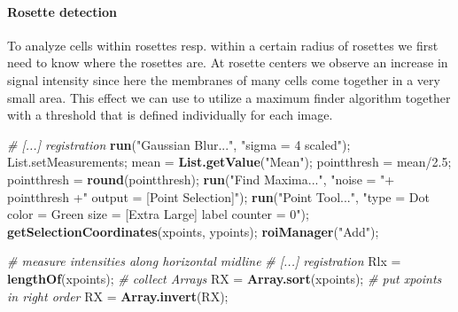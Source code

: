 \documentclass[11pt,singlespacinge,twoside]{reedthesis} %
\newenvironment{Shaded}{}{}
\newcommand{\CommentTok}[1]{\textit{#1}}
\newcommand{\FloatTok}[1]{#1}
\newcommand{\KeywordTok}[1]{\textbf{#1}}
\newcommand{\NormalTok}[1]{#1}
\newcommand{\OperatorTok}[1]{#1}
\newcommand{\StringTok}[1]{#1}
\theoremstyle{definition}
\theoremstyle{definition}
\theoremstyle{definition}
\theoremstyle{remark}
\begin{document}
\hypertarget{rosette-detection}{%
\paragraph{Rosette detection}\label{rosette-detection}}

To analyze cells within rosettes resp. within a certain radius of rosettes we first need to know where the rosettes are. At rosette centers we observe an increase in signal intensity since here the membranes of many cells come together in a very small area. This effect we can use to utilize a maximum finder algorithm together with a threshold that is defined individually for each image.

\scriptsize
\begin{Shaded}
\begin{Highlighting}[numbers=left,,]
\CommentTok{#  [...] registration}
    \KeywordTok{run}\NormalTok{(}\StringTok{"Gaussian Blur..."}\NormalTok{, }\StringTok{"sigma = 4 scaled"}\NormalTok{);}
\NormalTok{    List.setMeasurements;}
\NormalTok{    mean =}\StringTok{ }\KeywordTok{List.getValue}\NormalTok{(}\StringTok{"Mean"}\NormalTok{);}
\NormalTok{    pointthresh =}\StringTok{ }\NormalTok{mean}\OperatorTok{/}\FloatTok{2.5}\NormalTok{;}
\NormalTok{    pointthresh =}\StringTok{ }\KeywordTok{round}\NormalTok{(pointthresh);}
    \KeywordTok{run}\NormalTok{(}\StringTok{"Find Maxima..."}\NormalTok{, }\StringTok{"noise = "}\OperatorTok{+}\StringTok{ }\NormalTok{pointthresh }\OperatorTok{+}\StringTok{" output = [Point Selection]"}\NormalTok{);}
    \KeywordTok{run}\NormalTok{(}\StringTok{"Point Tool..."}\NormalTok{, }\StringTok{"type = Dot color = Green size = [Extra Large] label counter = 0"}\NormalTok{);}
    \KeywordTok{getSelectionCoordinates}\NormalTok{(xpoints, ypoints);}
    \KeywordTok{roiManager}\NormalTok{(}\StringTok{"Add"}\NormalTok{);}

\CommentTok{# measure intensities along horizontal midline}
\CommentTok{#   [...] registration}
\NormalTok{    Rlx =}\StringTok{ }\KeywordTok{lengthOf}\NormalTok{(xpoints); }\CommentTok{# collect Arrays}
\NormalTok{    RX =}\StringTok{ }\KeywordTok{Array.sort}\NormalTok{(xpoints); }\CommentTok{# put xpoints in right order}
\NormalTok{    RX =}\StringTok{ }\KeywordTok{Array.invert}\NormalTok{(RX);}


\end{Highlighting}
\end{Shaded}
\end{document}
